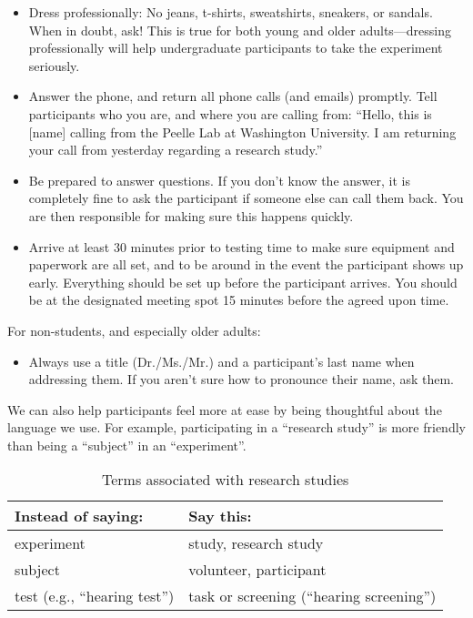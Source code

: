 \documentclass[letterpaper,12pt,oneside]{memoir}
\begin{document}
\begin{itemize}
\item Dress professionally: No jeans, t-shirts, sweatshirts, sneakers, or sandals. When in doubt, ask! This is true for both young and older adults---dressing professionally will help undergraduate participants to take the experiment seriously.
\item Answer the phone, and return all phone calls (and emails) promptly. Tell participants who you are, and where you are calling from: ``Hello, this is [name] calling from the Peelle Lab at Washington University. I am returning your call from yesterday regarding a research study.''
\item Be prepared to answer questions. If you don't know the answer, it is completely fine to ask the participant if someone else can call them back. You are then responsible for making sure this happens quickly.
\item Arrive at least 30 minutes prior to testing time to make sure equipment and paperwork are all set, and to be around in the event the participant shows up early. Everything should be set up before the participant arrives. You should be at the designated meeting spot 15 minutes before the agreed upon time.
\end{itemize}
	
For non-students, and especially older adults:

\begin{itemize}
\item Always use a title (Dr./Ms./Mr.) and a participant's last name when addressing them. If you aren't sure how to pronounce their name, ask them.
\end{itemize}

We can also help participants feel more at ease by being thoughtful about the language we use. For example, participating in a ``research study'' is more friendly than being a ``subject'' in an ``experiment''.

\begin{table}
\centering
\caption{Terms associated with research studies}
\begin{tabular}{ll}
\toprule
Instead of saying: & Say this:\\
\midrule
experiment& study, research study\\
subject& volunteer, participant\\
test (e.g., ``hearing test'')& task or screening (``hearing screening'')\\
\bottomrule
\end{tabular}
\end{table}
\end{document}
